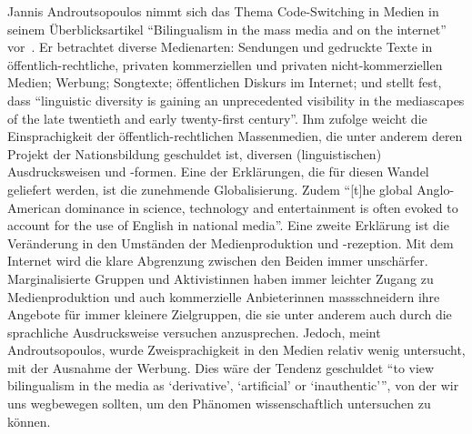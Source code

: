 Jannis Androutsopoulos nimmt sich das Thema Code-Switching in Medien in seinem Überblicksartikel ``Bilingualism in the mass media and on the internet'' vor~\cite[]{Andr07}.
Er betrachtet diverse Medienarten: Sendungen und gedruckte Texte in öffentlich-rechtliche, privaten kommerziellen und privaten nicht-kommerziellen Medien; Werbung; Songtexte; öffentlichen Diskurs im Internet;
und stellt fest, dass ``linguistic diversity is gaining an unprecedented visibility in the mediascapes of the late twentieth and early twenty-first century''.
Ihm zufolge weicht die Einsprachigkeit der öffentlich-rechtlichen Massenmedien, die unter anderem deren Projekt der Nationsbildung geschuldet ist, diversen (linguistischen) Ausdrucksweisen und -formen.
Eine der Erklärungen, die für diesen Wandel geliefert werden, ist die zunehmende Globalisierung.
Zudem ``[t]he global Anglo-American dominance in science, technology and entertainment is often evoked to account for the use of English in national media''.
Eine zweite Erklärung ist die Veränderung in den Umständen der Medienproduktion und -rezeption.
Mit dem Internet wird die klare Abgrenzung zwischen den Beiden immer unschärfer.
Marginalisierte Gruppen und Aktivistinnen haben immer leichter Zugang zu Medienproduktion und auch kommerzielle Anbieterinnen massschneidern ihre Angebote für immer kleinere Zielgruppen, die sie unter anderem auch durch die sprachliche Ausdrucksweise versuchen anzusprechen.
Jedoch, meint Androutsopoulos, wurde Zweisprachigkeit in den Medien relativ wenig untersucht, mit der Ausnahme der Werbung.
Dies wäre der Tendenz geschuldet ``to view bilingualism in the media as ‘derivative’, ‘artificial’ or ‘inauthentic’'', %
von der wir uns wegbewegen sollten, um den Phänomen wissenschaftlich untersuchen zu können.


